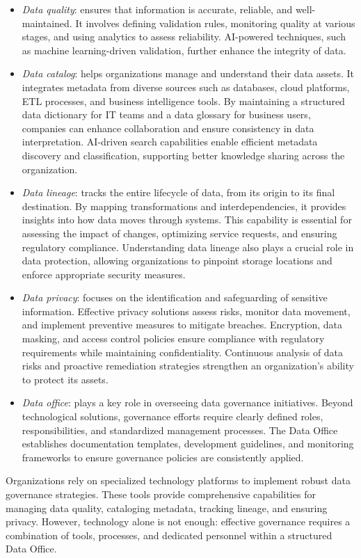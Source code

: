 \begin{itemize}
    \item \textit{Data quality}: ensures that information is accurate, reliable, and well-maintained. 
        It involves defining validation rules, monitoring quality at various stages, and using analytics to assess reliability. 
        AI-powered techniques, such as machine learning-driven validation, further enhance the integrity of data.
    \item \textit{Data catalog}: helps organizations manage and understand their data assets. 
        It integrates metadata from diverse sources such as databases, cloud platforms, ETL processes, and business intelligence tools. 
        By maintaining a structured data dictionary for IT teams and a data glossary for business users, companies can enhance collaboration and ensure consistency in data interpretation. 
        AI-driven search capabilities enable efficient metadata discovery and classification, supporting better knowledge sharing across the organization.
    \item \textit{Data lineage}: tracks the entire lifecycle of data, from its origin to its final destination. 
        By mapping transformations and interdependencies, it provides insights into how data moves through systems. 
        This capability is essential for assessing the impact of changes, optimizing service requests, and ensuring regulatory compliance. 
        Understanding data lineage also plays a crucial role in data protection, allowing organizations to pinpoint storage locations and enforce appropriate security measures.
    \item \textit{Data privacy}: focuses on the identification and safeguarding of sensitive information. 
        Effective privacy solutions assess risks, monitor data movement, and implement preventive measures to mitigate breaches. 
        Encryption, data masking, and access control policies ensure compliance with regulatory requirements while maintaining confidentiality. 
        Continuous analysis of data risks and proactive remediation strategies strengthen an organization's ability to protect its assets.
    \item \textit{Data office}: plays a key role in overseeing data governance initiatives. 
        Beyond technological solutions, governance efforts require clearly defined roles, responsibilities, and standardized management processes. 
        The Data Office establishes documentation templates, development guidelines, and monitoring frameworks to ensure governance policies are consistently applied.
\end{itemize}
\noindent Organizations rely on specialized technology platforms to implement robust data governance strategies. 
These tools provide comprehensive capabilities for managing data quality, cataloging metadata, tracking lineage, and ensuring privacy. 
However, technology alone is not enough: effective governance requires a combination of tools, processes, and dedicated personnel within a structured Data Office.

